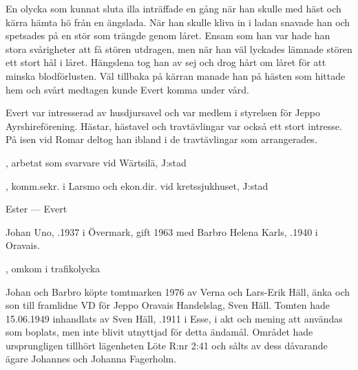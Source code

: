 En olycka som kunnat sluta illa inträffade en gång när han skulle med häst och kärra hämta hö från en ängslada. När han skulle kliva in i ladan snavade han och spetsades på en stör som trängde genom låret. Ensam som han var hade han stora svårigheter att få stören utdragen, men när han väl lyckades lämnade stören ett stort hål i låret. Hängslena tog han av sej och drog hårt om låret för att minska blodförlusten. Väl tillbaka på kärran manade han på hästen som hittade hem och svårt medtagen kunde Evert komma under vård.

Evert var intresserad av husdjursavel och var medlem i styrelsen för Jeppo Ayrshireförening. Hästar, hästavel och travtävlingar var också ett stort intresse. På isen vid Romar deltog han ibland i de travtävlingar som arrangerades.
\begin{jhchildren}
  \item {}
  \item {}, arbetat som svarvare vid Wärtsilä, J:stad
  \item {}
  \item {}, komm.sekr. i Larsmo och ekon.dir. vid kretssjukhuset, J:stad
\end{jhchildren}
Ester   ---  Evert 






Johan Uno, .1937 i Övermark, gift 1963 med Barbro Helena Karls, .1940 i Oravais.
\begin{jhchildren}
  \item {}
  \item {}, omkom i trafikolycka
  \item {}
\end{jhchildren}

Johan och Barbro köpte tomtmarken 1976 av Verna och Lars-Erik Häll, änka och son till framlidne VD för Jeppo Oravais Handelslag, Sven Häll. Tomten hade 15.06.1949 inhandlats av Sven Häll, .1911 i Esse, i akt och mening att användas som boplats, men inte blivit utnyttjad för detta ändamål. Området hade ursprungligen tillhört lägenheten Löte R:nr 2:41 och sålts av dess dåvarande ägare Johannes och Johanna Fagerholm.

